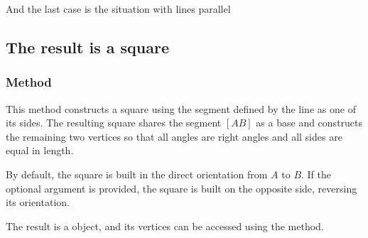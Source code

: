 And the last case is the situation with lines parallel

\begin{tkzexample}[latex=.5\textwidth]
\begin{center}
\end{center}
\end{tkzexample}


\subsection{The result is a square}


\subsubsection{Method }
\label{ssub:method_line_square}

This method constructs a square using the segment defined by the line as one of its sides. The resulting square shares the segment $[AB]$ as a base and constructs the remaining two vertices so that all angles are right angles and all sides are equal in length.

\medskip
\noindent
By default, the square is built in the direct orientation from $A$ to $B$. If the optional argument  is provided, the square is built on the opposite side, reversing its orientation.

\medskip
\noindent
The result is a  object, and its vertices can be accessed using the  method.

\vspace{1em}

\begin{tkzexample}[latex=.5\textwidth]

\end{tkzexample}

